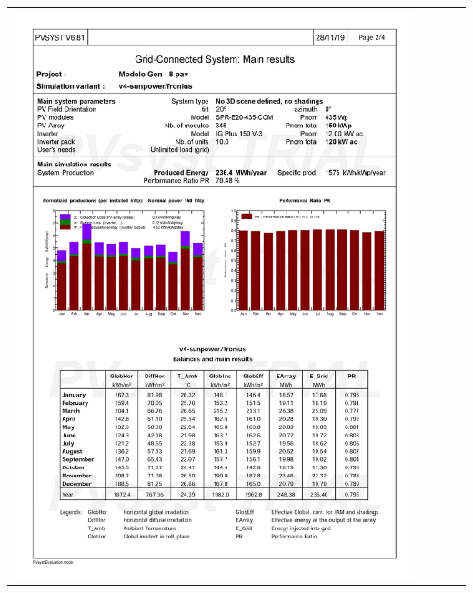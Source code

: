 \begin{table}[H]
    \centering
    \begin{tabular}{l}
        \includegraphics[width=0.9\textwidth]{figures/attachments/resultpv22.jpg}
    \end{tabular}
\end{table}
\pagebreak
